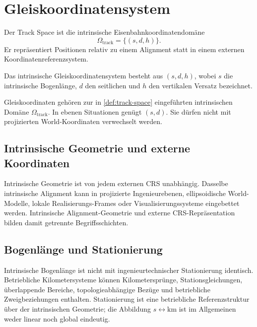 \section{Gleiskoordinatensystem}

\begin{definition}
\label{def:track-space}
Der Track Space ist die intrinsische Eisenbahnkoordinatendomäne
\[
\Omega_{\mathrm{track}}=\{(s,d,h)\}.
\]
Er repräsentiert Positionen relativ zu einem Alignment statt in einem
externen Koordinatenreferenzsystem.
\end{definition}

\begin{definition}[Gleiskoordinatensystem]
\label{def:track-coordinate-system}
Das intrinsische Gleiskoordinatensystem besteht aus \((s,d,h)\), wobei
\(s\) die intrinsische Bogenlänge, \(d\) den seitlichen und \(h\) den
vertikalen Versatz bezeichnet.
\end{definition}

Gleiskoordinaten gehören zur in \cref{def:track-space} eingeführten
intrinsischen Domäne \(\Omega_{\mathrm{track}}\). In ebenen Situationen
genügt \((s,d)\). Sie dürfen nicht mit projizierten World-Koordinaten
verwechselt werden.

\subsection{Intrinsische Geometrie und externe Koordinaten}

Intrinsische Geometrie ist von jedem externen CRS unabhängig. Dasselbe
intrinsische Alignment kann in projizierte Ingenieurebenen, ellipsoidische
World-Modelle, lokale Realisierungs-Frames oder Visualisierungssysteme
eingebettet werden. Intrinsische Alignment-Geometrie und externe
CRS-Repräsentation bilden damit getrennte Begriffsschichten.

\subsection{Bogenlänge und Stationierung}

Intrinsische Bogenlänge ist nicht mit ingenieurtechnischer Stationierung
identisch. Betriebliche Kilometersysteme können Kilometersprünge,
Stationsgleichungen, überlappende Bereiche, topologieabhängige Bezüge und
betriebliche Zweigbeziehungen enthalten. Stationierung ist eine betriebliche
Referenzstruktur über der intrinsischen Geometrie; die Abbildung
\(s\leftrightarrow\mathrm{km}\) ist im Allgemeinen weder linear noch global
eindeutig.


